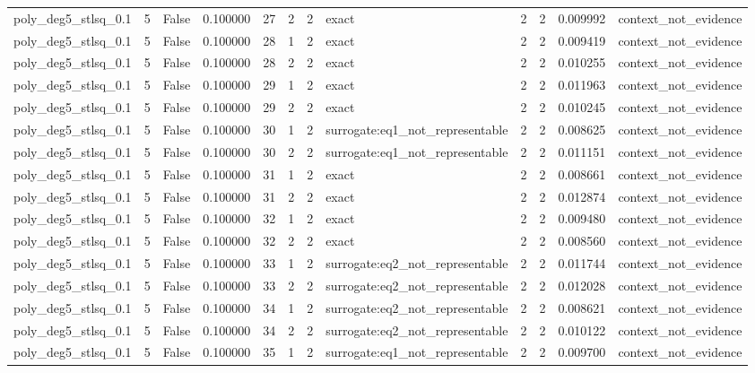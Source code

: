 \begin{tabular}{lrrrrrrlrrrl}
poly\_deg5\_stlsq\_0.1 & 5 & False & 0.100000 & 27 & 2 & 2 & exact & 2 & 2 & 0.009992 & context\_not\_evidence \\
poly\_deg5\_stlsq\_0.1 & 5 & False & 0.100000 & 28 & 1 & 2 & exact & 2 & 2 & 0.009419 & context\_not\_evidence \\
poly\_deg5\_stlsq\_0.1 & 5 & False & 0.100000 & 28 & 2 & 2 & exact & 2 & 2 & 0.010255 & context\_not\_evidence \\
poly\_deg5\_stlsq\_0.1 & 5 & False & 0.100000 & 29 & 1 & 2 & exact & 2 & 2 & 0.011963 & context\_not\_evidence \\
poly\_deg5\_stlsq\_0.1 & 5 & False & 0.100000 & 29 & 2 & 2 & exact & 2 & 2 & 0.010245 & context\_not\_evidence \\
poly\_deg5\_stlsq\_0.1 & 5 & False & 0.100000 & 30 & 1 & 2 & surrogate:eq1\_not\_representable & 2 & 2 & 0.008625 & context\_not\_evidence \\
poly\_deg5\_stlsq\_0.1 & 5 & False & 0.100000 & 30 & 2 & 2 & surrogate:eq1\_not\_representable & 2 & 2 & 0.011151 & context\_not\_evidence \\
poly\_deg5\_stlsq\_0.1 & 5 & False & 0.100000 & 31 & 1 & 2 & exact & 2 & 2 & 0.008661 & context\_not\_evidence \\
poly\_deg5\_stlsq\_0.1 & 5 & False & 0.100000 & 31 & 2 & 2 & exact & 2 & 2 & 0.012874 & context\_not\_evidence \\
poly\_deg5\_stlsq\_0.1 & 5 & False & 0.100000 & 32 & 1 & 2 & exact & 2 & 2 & 0.009480 & context\_not\_evidence \\
poly\_deg5\_stlsq\_0.1 & 5 & False & 0.100000 & 32 & 2 & 2 & exact & 2 & 2 & 0.008560 & context\_not\_evidence \\
poly\_deg5\_stlsq\_0.1 & 5 & False & 0.100000 & 33 & 1 & 2 & surrogate:eq2\_not\_representable & 2 & 2 & 0.011744 & context\_not\_evidence \\
poly\_deg5\_stlsq\_0.1 & 5 & False & 0.100000 & 33 & 2 & 2 & surrogate:eq2\_not\_representable & 2 & 2 & 0.012028 & context\_not\_evidence \\
poly\_deg5\_stlsq\_0.1 & 5 & False & 0.100000 & 34 & 1 & 2 & surrogate:eq2\_not\_representable & 2 & 2 & 0.008621 & context\_not\_evidence \\
poly\_deg5\_stlsq\_0.1 & 5 & False & 0.100000 & 34 & 2 & 2 & surrogate:eq2\_not\_representable & 2 & 2 & 0.010122 & context\_not\_evidence \\
poly\_deg5\_stlsq\_0.1 & 5 & False & 0.100000 & 35 & 1 & 2 & surrogate:eq1\_not\_representable & 2 & 2 & 0.009700 & context\_not\_evidence \\

\end{tabular}

